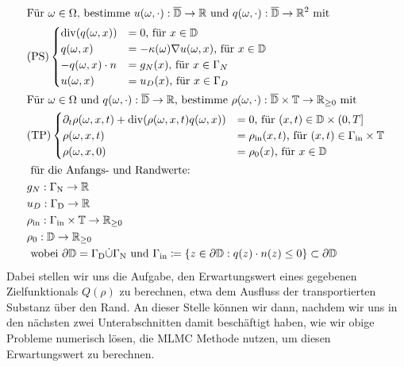 \begin{align*}
&\text{Für } \omega \in \Omega \text{, bestimme } u(\omega,\cdot):\overline{\mathbb{D}} \to \mathbb{R} \text{ und } q(\omega, \cdot): \overline{\mathbb{D}} \to \mathbb{R}^2 \text{ mit } \\
&\text{(PS)}
\begin{cases}
\operatorname{div} (q(\omega,x)) &= 0  \text{, für } x \in \mathbb{ D}\\  
q(\omega,x) &= - \kappa(\omega) \nabla u(\omega,x)  \text{, für } x \in \mathbb{D}\\
-q(\omega,x) \cdot n &= g_N(x)  \text{, für } x \in \Gamma_N \\
u(\omega,x) &= u_D(x)  \text{, für } x \in \Gamma_D \\
\end{cases} \\
&\text{Für } \omega \in \Omega \text{ und }q(\omega,\cdot): \overline{\mathbb{D}} \to \mathbb{R} \text{, bestimme }\rho(\omega,\cdot): \overline{\mathbb{D}} \times \mathbb{T} \to \mathbb{R}_{\geq 0} \text{ mit} \\
&\text{(TP)} 
\begin{cases}
\partial_t \rho (\omega, x, t) + \operatorname{div}(\rho(\omega,x,t)q(\omega,x)) &= 0 \text{, für } (x,t) \in \mathbb{D} \times (0,T] \\
\rho(\omega,x,t) &= \rho_{\text{in}}(x,t) \text{, für } (x,t) \in \Gamma_{\text{in}} \times \mathbb{T} \\
\rho(\omega,x,0)  &= \rho_0(x) \text{, für } x \in  \mathbb{D}
\end{cases} \\
&\text{ für die Anfangs- und Randwerte: } \\ 
&g_N: \Gamma_{\text{N}} \to \mathbb{R} \\
&u_D: \Gamma_{\text{D}} \to \mathbb{R} \\
&\rho_{\text{in}}: \Gamma_{\text{in}} \times \mathbb{T} \to \mathbb{R}_{\geq0} \\
&\rho_0: \mathbb{D} \to \mathbb{R}_{\geq0} \\
&\text{ wobei } \partial \mathbb{D} = \Gamma_{\text{D}} \dot{\cup} \Gamma_{\text{N}}  \text{ und }  \Gamma_{\text{in}} \coloneqq  \{ z \in \partial \mathbb{D}: q(z)\cdot n(z) \leq 0 \} \subset  \partial \mathbb{D}
\end{align*}
Dabei stellen wir uns die Aufgabe, den Erwartungswert eines gegebenen Zielfunktionals $Q(\rho)$ zu berechnen, etwa dem Ausfluss der transportierten Substanz über den Rand. An dieser Stelle können wir dann, nachdem wir uns in den nächsten zwei Unterabschnitten damit beschäftigt haben, wie wir obige Probleme numerisch lösen, die MLMC Methode nutzen, um diesen Erwartungswert zu berechnen. 

